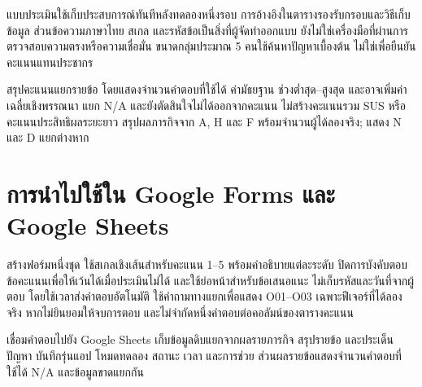 แบบประเมินใช้เก็บประสบการณ์ทันทีหลังทดลองหนึ่งรอบ การอ้างอิงในตารางรองรับกรอบและวิธีเก็บข้อมูล ส่วนข้อความภาษาไทย สเกล และรหัสข้อเป็นสิ่งที่ผู้จัดทำออกแบบ ยังไม่ใช่เครื่องมือที่ผ่านการตรวจสอบความตรงหรือความเชื่อมั่น ขนาดกลุ่มประมาณ 5 คนใช้ค้นหาปัญหาเบื้องต้น ไม่ใช่เพื่อยืนยันคะแนนแทนประชากร \cite{budiu2021five}

สรุปคะแนนแยกรายข้อ โดยแสดงจำนวนคำตอบที่ใช้ได้ ค่ามัธยฐาน ช่วงต่ำสุด--สูงสุด และอาจเพิ่มค่าเฉลี่ยเชิงพรรณนา แยก N/A และยังตัดสินใจไม่ได้ออกจากคะแนน ไม่สร้างคะแนนรวม SUS หรือคะแนนประสิทธิผลระยะยาว สรุปผลภารกิจจาก A, H และ F พร้อมจำนวนผู้ได้ลองจริง; แสดง N และ D แยกต่างหาก

\section*{การนำไปใช้ใน Google Forms และ Google Sheets}

สร้างฟอร์มหนึ่งชุด ใช้สเกลเชิงเส้นสำหรับคะแนน 1--5 พร้อมคำอธิบายแต่ละระดับ ปิดการบังคับตอบข้อคะแนนเพื่อให้เว้นได้เมื่อประเมินไม่ได้ และใช้ย่อหน้าสำหรับข้อเสนอแนะ ไม่เก็บรหัสและวันที่จากผู้ตอบ โดยใช้เวลาส่งคำตอบอัตโนมัติ ใช้คำถามทางแยกเพื่อแสดง O01--O03 เฉพาะฟีเจอร์ที่ได้ลองจริง หากไม่ยินยอมให้จบการตอบ และไม่จำกัดหนึ่งคำตอบต่อคอลัมน์ของตารางคะแนน \cite{googleFormsQuestionTypes}

เชื่อมคำตอบไปยัง Google Sheets \cite{googleFormsResponses} เก็บข้อมูลดิบแยกจากผลรายภารกิจ สรุปรายข้อ และประเด็นปัญหา บันทึกรุ่นแอป โหมดทดลอง สถานะ เวลา และการช่วย ส่วนผลรายข้อแสดงจำนวนคำตอบที่ใช้ได้ \mbox{N/A} และข้อมูลขาดแยกกัน
